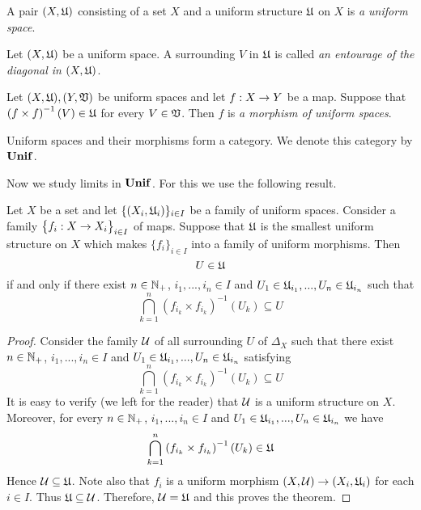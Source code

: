\begin{definition}
A pair $(X,{\mathfrak U})$ consisting of a set $X$ and a uniform structure ${\mathfrak U}$ on $X$ is \textit{a uniform space}.
\end{definition}

\begin{definition}
Let $(X,{\mathfrak U})$ be a uniform space. A surrounding $V$ in ${\mathfrak U}$ is called \textit{an entourage of the diagonal in $(X,{\mathfrak U})$}. 
\end{definition}

\begin{definition}
Let $(X,{\mathfrak U}),(Y,{\mathfrak V})$ be uniform spaces and let $f:X\rightarrow Y$ be a map. Suppose that $\left(f\times f\right)^{-1}(V) \in {\mathfrak U}$ for every $V\in {\mathfrak V}$. Then $f$ is \textit{a morphism of uniform spaces}. 
\end{definition}

\begin{remark}\label{remark:category_of_uniform_spaces}
Uniform spaces and their morphisms form a category. We denote this category by $\mathbf{Unif}$.
\end{remark}
\noindent
Now we study limits in $\mathbf{Unif}$. For this we use the following result.

\begin{theorem}\label{theorem:description_of_uniform_structure_introduced_by_a_family_of_maps}
Let $X$ be a set and let $\{(X_i,{\mathfrak U}_i)\}_{i\in I}$ be a family of uniform spaces. Consider a family $\big\{f_i:X\rightarrow X_i\big\}_{i\in I}$ of maps. Suppose that ${\mathfrak U}$ is the smallest uniform structure on $X$ which makes $\{f_i\}_{i\in I}$ into a family of uniform morphisms. Then 
$$U \in {\mathfrak U}$$
if and only if there exist $n\in {\mathbb N}_+$, $i_1,...,i_n\in I$ and $U_1 \in {\mathfrak U}_{i_1},...,U_n\in {\mathfrak U}_{i_n}$ such that
$$\bigcap_{k=1}^n\left(f_{i_k}\times f_{i_k}\right)^{-1}(U_k) \subseteq U$$
\end{theorem}
\begin{proof}
Consider the family ${\mathcal U}$ of all surrounding $U$ of $\Delta_X$ such that there exist $n\in {\mathbb N}_+$, $i_1,...,i_n\in I$ and $U_1 \in {\mathfrak U}_{i_1},...,U_n\in {\mathfrak U}_{i_n}$ satisfying
$$\bigcap_{k=1}^n\left(f_{i_k}\times f_{i_k}\right)^{-1}(U_k) \subseteq U$$
It is easy to verify (we left for the reader) that ${\mathcal U}$ is a uniform structure on $X$. Moreover, for every $n\in {\mathbb N}_+$, $i_1,...,i_n\in I$ and $U_1 \in {\mathfrak U}_{i_1},...,U_n\in {\mathfrak U}_{i_n}$ we have
$$\bigcap_{k=1}^n\left(f_{i_k}\times f_{i_k}\right)^{-1}(U_k) \in {\mathfrak U}$$
Hence ${\mathcal U} \subseteq {\mathfrak U}$. Note also that $f_i$ is a uniform morphism $(X,{\mathcal U})\rightarrow (X_i,{\mathfrak U}_i)$ for each $i\in I$. Thus ${\mathfrak U} \subseteq {\mathcal U}$. Therefore, ${\mathcal U} = {\mathfrak U}$ and this proves the theorem. 
\end{proof}

